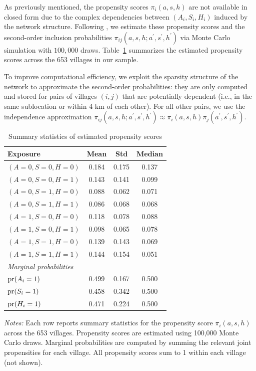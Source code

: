 \documentclass{article}
\newcommand{\pr}{\textup{pr}}
\newcommand{\ashprime}{a^{\prime},s^{\prime},h^{\prime}}
\newcommand{\pscore}[1]{\pi_{#1}}
\begin{document}
As previously mentioned, the propensity scores $\pscore{i}(a,s,h)$ are not available in closed form due to the complex dependencies between $(A_i, S_i, H_i)$ induced by the network structure. Following \citet{aronow2017estimating}, we estimate these propensity scores and the second-order inclusion probabilities $\pscore{ij}(a,s,h;\ashprime)$ via Monte Carlo simulation with $100,000$ draws. Table~\ref{tab:propensity_scores} summarizes the estimated propensity scores across the 653 villages in our sample. 

To improve computational efficiency, we exploit the sparsity structure of the network to approximate the second-order probabilities: they are only computed and stored for pairs of villages $(i,j)$ that are potentially dependent (i.e., in the same sublocation or within 4 km of each other). For all other pairs, we use the independence approximation $\pscore{ij}(a,s,h;\ashprime) \approx \pscore{i}(a,s,h) \pscore{j}(\ashprime)$. 

\begin{table}[htbp]
\centering
\caption{Summary statistics of estimated propensity scores}
\label{tab:propensity_scores}
\begin{tabular}{lccc}
\toprule
Exposure & Mean & Std & Median \\
\midrule
$(A=0,S=0,H=0)$ & 0.184 & 0.175 & 0.137 \\
$(A=0,S=0,H=1)$ & 0.143 & 0.141 & 0.099 \\
$(A=0,S=1,H=0)$ & 0.088 & 0.062 & 0.071 \\
$(A=0,S=1,H=1)$ & 0.086 & 0.068 & 0.068 \\
$(A=1,S=0,H=0)$ & 0.118 & 0.078 & 0.088 \\
$(A=1,S=0,H=1)$ & 0.098 & 0.065 & 0.078 \\
$(A=1,S=1,H=0)$ & 0.139 & 0.143 & 0.069 \\
$(A=1,S=1,H=1)$ & 0.144 & 0.154 & 0.051 \\
\midrule
\multicolumn{4}{l}{\textit{Marginal probabilities}} \\
$\pr(A_i = 1)$ & 0.499 & 0.167 & 0.500 \\
$\pr(S_i = 1)$ & 0.458 & 0.342 & 0.500 \\
$\pr(H_i = 1)$ & 0.471 & 0.224 & 0.500 \\
\bottomrule
\end{tabular}
\begin{flushleft}
\footnotesize
\textit{Notes:} Each row reports summary statistics for the propensity score $\pscore{i}(a,s,h)$ across the 653 villages. Propensity scores are estimated using 100{,}000 Monte Carlo draws. Marginal probabilities are computed by summing the relevant joint propensities for each village. All propensity scores sum to 1 within each village (not shown).
\end{flushleft}
\end{table}
\end{document}

